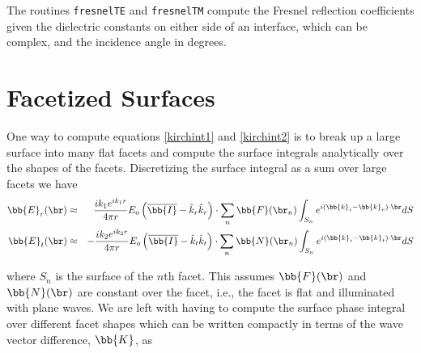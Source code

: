 The routines \texttt{fresnelTE} and \texttt{fresnelTM} compute the Fresnel reflection coefficients given the dielectric constants on either side of an interface, which can be complex, and the incidence angle in degrees.

{\scriptsize
{}
}

{\scriptsize
{}
}


%
%
%

\section{Facetized Surfaces}

One way to compute equations \eqref{kirchint1} and \eqref{kirchint2} is to break up a large surface into many flat facets and compute the surface integrals analytically over the shapes of the facets. Discretizing the surface integral as a sum over large facets we have
\begin{eqnarray}
\bb{E}_r(\br) & \approx & \dfrac{ik_1e^{ik_1r}}{4\pi r} E_o \left( \overline{\bb{I}} - \hat{k}_r \hat{k}_r \right)  \cdot \sum_n \bb{F}(\br_n) \int_{S_n} e^{i (\bb{k}_i - \bb{k}_r) \cdot \br} dS \label{faceter} \\
\bb{E}_t(\br) & \approx & -\dfrac{ik_2e^{ik_2r}}{4\pi r} E_o \left( \overline{\bb{I}} - \hat{k}_t \hat{k}_t \right)  \cdot \sum_n \bb{N}(\br_n) \int_{S_n}  e^{i (\bb{k}_i - \bb{k}_t) \cdot \br} dS  \label{facetet}
\end{eqnarray}

\noindent where $S_n$ is the surface of the $n$th facet.  This assumes $\bb{F}(\br)$ and $\bb{N}(\br)$ are constant over the facet, i.e., the facet is flat and illuminated with plane waves. We are left with having to compute the surface phase integral over different facet shapes which can be written compactly in terms of the wave vector difference, $\bb{K}$, as

